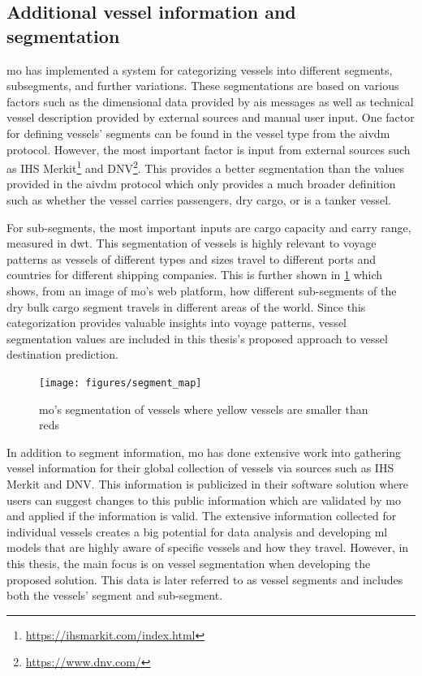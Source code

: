 \subsection{Additional vessel information and segmentation}
\label{sec:vessel_info_segments}

\acrshort{mo} has implemented a system for categorizing vessels into different segments, subsegments, and further variations. These segmentations are based on various factors such as the dimensional data provided by \acrshort{ais} messages as well as technical vessel description provided by external sources and manual user input. One factor for defining vessels' segments can be found in the vessel type from the \gls{aivdm} protocol. However, the most important factor is input from external sources such as IHS Merkit\footnote{\url{https://ihsmarkit.com/index.html}} and DNV\footnote{\url{https://www.dnv.com/}}. This provides a better segmentation than the values provided in the \gls{aivdm} protocol which only provides a much broader definition such as whether the vessel carries passengers, dry cargo, or is a tanker vessel.

For sub-segments, the most important inputs are cargo capacity and carry range, measured in \acrshort{dwt}. This segmentation of vessels is highly relevant to voyage patterns as vessels of different types and sizes travel to different ports and countries for different shipping companies. This is further shown in \cref{fig:segment_map} which shows, from an image of \acrshort{mo}'s web platform, how different sub-segments of the dry bulk cargo segment travels in different areas of the world. Since this categorization provides valuable insights into voyage patterns, vessel segmentation values are included in this thesis's proposed approach to vessel destination prediction.

\begin{figure}[htbp]
    \centering
    \texttt{[image: figures/segment\_map]}
    \caption{\acrfull{mo}’s segmentation of vessels where yellow vessels are smaller than reds}
    \label{fig:segment_map}
\end{figure}

In addition to segment information, \acrshort{mo} has done extensive work into gathering vessel information for their global collection of vessels via sources such as IHS Merkit and DNV. This information is publicized in their software solution where users can suggest changes to this public information which are validated by \acrshort{mo} and applied if the information is valid. The extensive information collected for individual vessels creates a big potential for data analysis and developing \acrshort{ml} models that are highly aware of specific vessels and how they travel. However, in this thesis, the main focus is on vessel segmentation when developing the proposed solution. This data is later referred to as vessel segments and includes both the vessels' segment and sub-segment.

